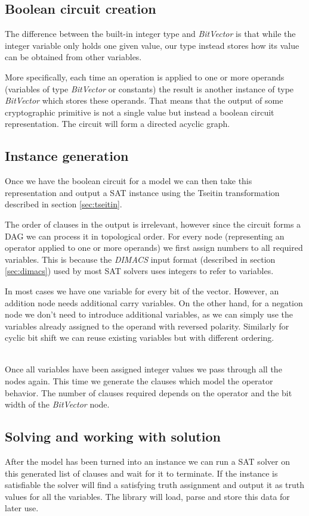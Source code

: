 \subsection{Boolean circuit creation}
The difference between the built-in integer type and \emph{BitVector} is that while the integer variable only holds one given value, our type instead stores how its value can be obtained from other variables.

More specifically, each time an operation is applied to one or more operands (variables of type \emph{BitVector} or constants) the result is another instance of type \emph{BitVector} which stores these operands.  That means that the output of some cryptographic primitive is not a single value but instead a boolean circuit representation. The circuit will form a directed acyclic graph.

\subsection{Instance generation}
Once we have the boolean circuit for a model we can then take this representation and output a SAT instance using the Tseitin transformation described in section \ref{sec:tseitin}.

The order of clauses in the output is irrelevant, however since the circuit forms a DAG we can process it in topological order.
For every node (representing an operator applied to one or more operands) we first assign numbers to all required variables.
This is because the \emph{DIMACS} input format (described in section \ref{sec:dimacs}) used by most SAT solvers uses integers to refer to variables.

In most cases we have one variable for every bit of the vector.
However, an addition node needs additional carry variables.
On the other hand, for a negation node we don't need to introduce additional variables, as we can simply use the variables already assigned to the operand with reversed polarity.
Similarly for cyclic bit shift we can reuse existing variables but with different ordering.

~\\

Once all variables have been assigned integer values we pass through all the nodes again.
This time we generate the clauses which model the operator behavior.
The number of clauses required depends on the operator and the bit width of the \emph{BitVector} node.

\subsection{Solving and working with solution}
After the model has been turned into an instance we can run a SAT solver on this generated list of clauses and wait for it to terminate.
If the instance is satisfiable the solver will find a satisfying truth assignment and output it as truth values for all the variables.
The library will load, parse and store this data for later use.


